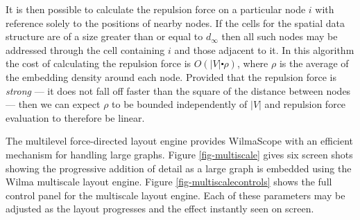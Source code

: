 \documentclass[runningheads]{cl2emult}
\begin{document}
It is then possible to calculate the repulsion force on a particular node $i$
with reference solely to the positions of nearby nodes.  If the cells for
the spatial data structure are of a size greater than or equal to $d_\infty$
then all such nodes may be addressed through the cell containing $i$ and
those adjacent to it.  In this algorithm the cost of calculating the
repulsion force is $O(|V| \centerdot \rho)$, where $\rho$ is the average 
of the embedding density around each node.  Provided that the repulsion
force is {\em strong} --- it does not fall off faster than the square
of the distance between nodes --- then we can expect $\rho$ to be bounded
independently of $|V|$ and repulsion force evaluation to therefore be linear.

The multilevel force-directed layout engine provides WilmaScope with
an efficient mechanism for handling large graphs.  Figure
\ref{fig-multiscale} gives six screen shots showing the progressive
addition of detail as a large graph is embedded using the Wilma multiscale
layout engine.  Figure \ref{fig-multiscalecontrols} shows the full
control panel for the multiscale layout engine.  Each of these
parameters may be adjusted as the layout progresses and the effect
instantly seen on screen.
\end{document}
